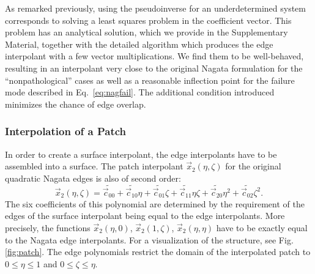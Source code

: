 \documentclass[twocolumn]{biophys-new}
\begin{document}
As remarked previously, using the pseudoinverse for an underdetermined system corresponds to solving a least squares problem in the coefficient vector. This problem has an analytical solution, which we provide in the Supplementary Material, together with the detailed algorithm which produces the edge interpolant with a few vector multiplications.
We find them to be well-behaved, resulting in an interpolant very close to the original Nagata formulation for the ``nonpathological'' cases as well as a reasonable inflection point for the failure mode described in Eq.~\eqref{eq:nagfail}. The additional condition introduced minimizes the chance of edge overlap. 
\subsubsection*{Interpolation of a Patch}
In order to create a surface interpolant, the edge interpolants have to be assembled into a surface. The patch interpolant $\vec{x}_2(\eta, \zeta)$ for the original quadratic Nagata edges is also of second order:
\begin{equation}
  \label{eq:interpolant}
  \vec{x}_2(\eta, \zeta)
  =
  \widetilde{\vec{c}_{00}}
  +
  \widetilde{\vec{c}_{10}} \eta
  +
  \widetilde{\vec{c}_{01}} \zeta
  +
  \widetilde{\vec{c}_{11}} \eta \zeta
  +
  \widetilde{\vec{c}_{20}} \eta^2
  +
  \widetilde{\vec{c}_{02}} \zeta^2.
\end{equation}
The six coefficients of this polynomial are determined by the requirement of the edges of the surface interpolant being equal to the edge interpolants. More precisely, the functions $\vec{x}_2(\eta, 0)$,  $\vec{x}_2(1, \zeta)$, $\vec{x}_2(\eta, \eta)$ have to be exactly equal to the Nagata edge interpolants. For a visualization of the structure, see Fig. \ref{fig:patch}. The edge polynomials restrict the domain of the interpolated patch to $0 \leq \eta \leq 1$ and $0 \leq \zeta \leq \eta $. 
\end{document}
